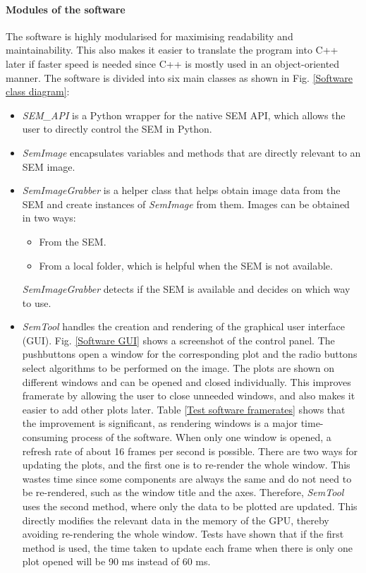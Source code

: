 \documentclass[12pt, twocolumn]{report}
\begin{document}
\paragraph{Modules of the software}
The software is highly modularised for maximising readability and maintainability. This also makes it easier to translate the program into C++ later if faster speed is needed since C++ is mostly used in an object-oriented manner. The software is divided into six main classes as shown in Fig. \ref{Software class diagram}:
\begin{itemize}
    \item \textit{SEM\_API} is a Python wrapper for the native SEM API, which allows the user to directly control the SEM in Python.
    \item \textit{SemImage} encapsulates variables and methods that are directly relevant to an SEM image.
    \item \textit{SemImageGrabber} is a helper class that helps obtain image data from the SEM and create instances of \textit{SemImage} from them. Images can be obtained in two ways:
    \begin{itemize}
        \item From the SEM.
        \item From a local folder, which is helpful when the SEM is not available.
    \end{itemize}
    \textit{SemImageGrabber} detects if the SEM is available and decides on which way to use.
    \item \textit{SemTool} handles the creation and rendering of the graphical user interface (GUI). Fig. \ref{Software GUI} shows a screenshot of the control panel. The pushbuttons open a window for the corresponding plot and the radio buttons select algorithms to be performed on the image. The plots are shown on different windows and can be opened and closed individually. This improves framerate by allowing the user to close unneeded windows, and also makes it easier to add other plots later. Table \ref{Test software framerates} shows that the improvement is significant, as rendering windows is a major time-consuming process of the software. When only one window is opened, a refresh rate of about 16 frames per second is possible. There are two ways for updating the plots, and the first one is to re-render the whole window. This wastes time since some components are always the same and do not need to be re-rendered, such as the window title and the axes. Therefore, \textit{SemTool} uses the second method, where only the data to be plotted are updated. This directly modifies the relevant data in the memory of the GPU, thereby avoiding re-rendering the whole window. Tests have shown that if the first method is used, the time taken to update each frame when there is only one plot opened will be 90 ms instead of 60 ms.

\end{itemize}
\end{document}
